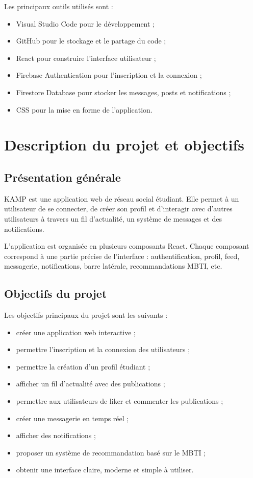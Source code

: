 \documentclass[a4paper, 12pt, twoside]{article}
\begin{document}
Les principaux outils utilisés sont :

\begin{itemize}
    \item Visual Studio Code pour le développement ;
    \item GitHub pour le stockage et le partage du code ;
    \item React pour construire l'interface utilisateur ;
    \item Firebase Authentication pour l'inscription et la connexion ;
    \item Firestore Database pour stocker les messages, posts et notifications ;
    \item CSS pour la mise en forme de l'application.
\end{itemize}

\section{Description du projet et objectifs}

\subsection{Présentation générale}

KAMP est une application web de réseau social étudiant. 
Elle permet à un utilisateur de se connecter, de créer son profil et d'interagir avec d'autres utilisateurs à travers un fil d'actualité, un système de messages et des notifications.

L'application est organisée en plusieurs composants React. 
Chaque composant correspond à une partie précise de l'interface : authentification, profil, feed, messagerie, notifications, barre latérale, recommandations MBTI, etc.

\subsection{Objectifs du projet}

Les objectifs principaux du projet sont les suivants :

\begin{itemize}
    \item créer une application web interactive ;
    \item permettre l'inscription et la connexion des utilisateurs ;
    \item permettre la création d'un profil étudiant ;
    \item afficher un fil d'actualité avec des publications ;
    \item permettre aux utilisateurs de liker et commenter les publications ;
    \item créer une messagerie en temps réel ;
    \item afficher des notifications ;
    \item proposer un système de recommandation basé sur le MBTI ;
    \item obtenir une interface claire, moderne et simple à utiliser.
\end{itemize}
\end{document}
